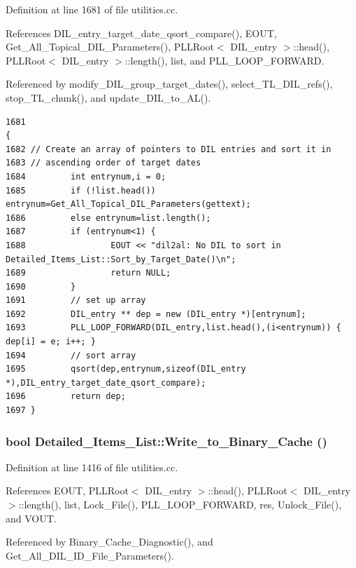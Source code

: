 Definition at line 1681 of file utilities.cc.

References DIL\_\-entry\_\-target\_\-date\_\-qsort\_\-compare(), EOUT, Get\_\-All\_\-Topical\_\-DIL\_\-Parameters(), PLLRoot$<$ DIL\_\-entry $>$::head(), PLLRoot$<$ DIL\_\-entry $>$::length(), list, and PLL\_\-LOOP\_\-FORWARD.

Referenced by modify\_\-DIL\_\-group\_\-target\_\-dates(), select\_\-TL\_\-DIL\_\-refs(), stop\_\-TL\_\-chunk(), and update\_\-DIL\_\-to\_\-AL().



\footnotesize\begin{verbatim}1681                                                                           {
1682 // Create an array of pointers to DIL entries and sort it in
1683 // ascending order of target dates
1684         int entrynum,i = 0;
1685         if (!list.head()) entrynum=Get_All_Topical_DIL_Parameters(gettext);
1686         else entrynum=list.length();
1687         if (entrynum<1) {
1688                 EOUT << "dil2al: No DIL to sort in Detailed_Items_List::Sort_by_Target_Date()\n";
1689                 return NULL;
1690         }
1691         // set up array
1692         DIL_entry ** dep = new (DIL_entry *)[entrynum];
1693         PLL_LOOP_FORWARD(DIL_entry,list.head(),(i<entrynum)) { dep[i] = e; i++; }
1694         // sort array
1695         qsort(dep,entrynum,sizeof(DIL_entry *),DIL_entry_target_date_qsort_compare);
1696         return dep;
1697 }
\end{verbatim}\normalsize 
{}
\subsubsection{\setlength{\rightskip}{0pt plus 5cm}bool Detailed\_\-Items\_\-List::Write\_\-to\_\-Binary\_\-Cache ()\hspace{0.3cm}{\tt  [protected]}}\label{classDetailed__Items__List_b0}




Definition at line 1416 of file utilities.cc.

References EOUT, PLLRoot$<$ DIL\_\-entry $>$::head(), PLLRoot$<$ DIL\_\-entry $>$::length(), list, Lock\_\-File(), PLL\_\-LOOP\_\-FORWARD, res, Unlock\_\-File(), and VOUT.

Referenced by Binary\_\-Cache\_\-Diagnostic(), and Get\_\-All\_\-DIL\_\-ID\_\-File\_\-Parameters().



